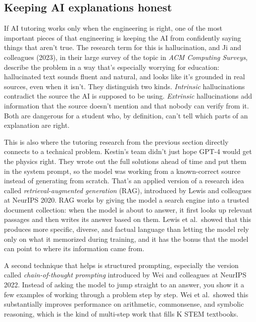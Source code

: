 \documentclass[11pt,letterpaper]{article}
\begin{document}
\subsection{Keeping AI explanations honest}

If AI tutoring works only when the engineering is right, one of the most
important pieces of that engineering is keeping the AI from confidently saying
things that aren't true. The research term for this is hallucination, and Ji
and colleagues (2023), in their large survey of the topic in \textit{ACM
Computing Surveys}, describe the problem in a way that's especially worrying
for education: hallucinated text sounds fluent and natural, and looks like
it's grounded in real sources, even when it isn't. They distinguish two kinds.
\emph{Intrinsic} hallucinations contradict the source the AI is supposed to be
using. \emph{Extrinsic} hallucinations add information that the source doesn't
mention and that nobody can verify from it. Both are dangerous for a student
who, by definition, can't tell which parts of an explanation are right.

This is also where the tutoring research from the previous section directly
connects to a technical problem. Kestin's team didn't just hope GPT-4 would
get the physics right. They wrote out the full solutions ahead of time and
put them in the system prompt, so the model was working from a known-correct
source instead of generating from scratch. That's an applied version of a
research idea called \emph{retrieval-augmented generation} (RAG), introduced
by Lewis and colleagues at NeurIPS 2020. RAG works by giving the model a
search engine into a trusted document collection: when the model is about to
answer, it first looks up relevant passages and then writes its answer based
on them. Lewis et al.\ showed that this produces more specific, diverse, and
factual language than letting the model rely only on what it memorized during
training, and it has the bonus that the model can point to where its
information came from.

A second technique that helps is structured prompting, especially the version
called \emph{chain-of-thought prompting} introduced by Wei and colleagues at
NeurIPS 2022. Instead of asking the model to jump straight to an answer, you
show it a few examples of working through a problem step by step. Wei et al.\
showed this substantially improves performance on arithmetic, commonsense, and
symbolic reasoning, which is the kind of multi-step work that fills
K\textendash 12 STEM textbooks.
\end{document}
